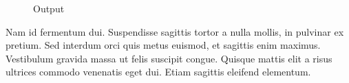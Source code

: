 \documentclass[sigconf]{acmart}
\begin{document}
\begin{figure}[h]
\centering
{}
\caption{Output}
\end{figure}

Nam id fermentum dui. Suspendisse sagittis tortor a nulla mollis, in
pulvinar ex pretium. Sed interdum orci quis metus euismod, et sagittis
enim maximus. Vestibulum gravida massa ut felis suscipit
congue. Quisque mattis elit a risus ultrices commodo venenatis eget
dui. Etiam sagittis eleifend elementum.
\end{document}
